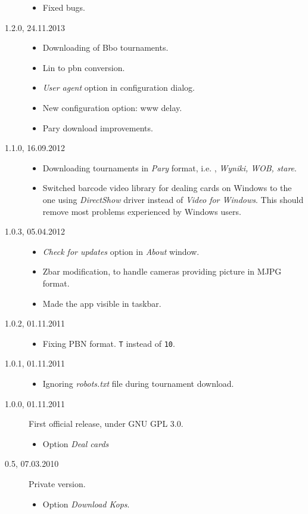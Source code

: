 \documentclass[polish,a4paper,11pt,oneside]{article}
\begin{document}
\begin{description}
\begin{itemize}
  \item Fixed bugs.
  \end{itemize}
\item[1.2.0, 24.11.2013]
  \begin{itemize}
  \item Downloading of Bbo tournaments.
  \item Lin to pbn conversion.
  \item {\em User agent} option in configuration dialog.
  \item New configuration option: www delay.
  \item Pary download improvements.
  \end{itemize}
\item[1.1.0, 16.09.2012]
  \begin{itemize}
  \item Downloading tournaments in {\em Pary} format,
        i.e. 
        , {\em Wyniki, WOB, stare}.
  \item Switched barcode video library for dealing cards on Windows
        to the one using
        {\em DirectShow} driver instead of
        {\em Video for Windows}. This should remove most problems
        experienced by Windows users.
  \end{itemize}
\item[1.0.3, 05.04.2012]
  \begin{itemize}
  \item {\em Check for updates} option in {\em About} window.
  \item Zbar modification, to handle cameras providing picture in
        MJPG format.
  \item Made the app visible in taskbar.
  \end{itemize}
\item[1.0.2, 01.11.2011]
  \begin{itemize}
  \item Fixing PBN format. \verb!T! instead of \verb!10!.
  \end{itemize}
\item[1.0.1, 01.11.2011]
  \begin{itemize}
  \item Ignoring {\em robots.txt} file during tournament download.
  \end{itemize}
\item[1.0.0, 01.11.2011]
  First official release, under GNU GPL 3.0.
  \begin{itemize}
  \item Option {\em Deal cards}
  \end{itemize}
\item[0.5, 07.03.2010]
  Private version.
  \begin{itemize}
  \item Option {\em Download Kops}.
  \end{itemize}
\end{description}
\end{document}
